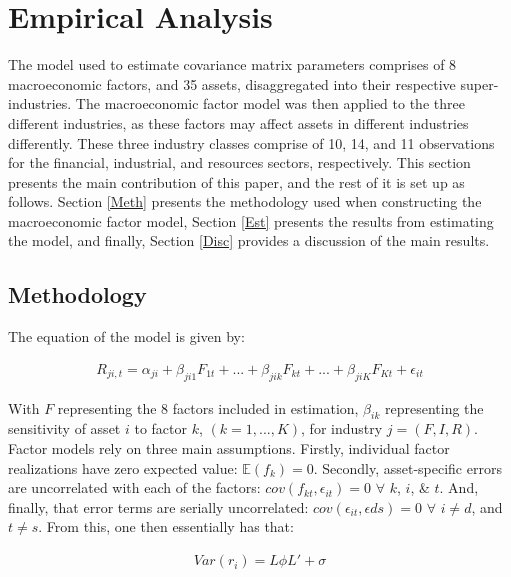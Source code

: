 \documentclass[11pt,preprint, authoryear]{elsarticle}
\numberwithin{equation}{section}
\numberwithin{figure}{section}
\numberwithin{table}{section}
\begin{document}
\hypertarget{empirical-analysis}{%
\section{Empirical Analysis}\label{empirical-analysis}}

The model used to estimate covariance matrix parameters comprises of 8
macroeconomic factors, and 35 assets, disaggregated into their
respective super-industries. The macroeconomic factor model was then
applied to the three different industries, as these factors may affect
assets in different industries differently. These three industry classes
comprise of 10, 14, and 11 observations for the financial, industrial,
and resources sectors, respectively. This section presents the main
contribution of this paper, and the rest of it is set up as follows.
Section \ref{Meth} presents the methodology used when constructing the
macroeconomic factor model, Section \ref{Est} presents the results from
estimating the model, and finally, Section \ref{Disc} provides a
discussion of the main results.

\hypertarget{methodology}{%
\subsection{\texorpdfstring{Methodology
\label{Meth}}{Methodology }}\label{methodology}}

The equation of the model is given by:

\begin{align}
R_{ji,t}=\alpha_{ji} + \beta_{ji1}F_{1t} + ... + \beta_{jik}F_{kt} +...+\beta_{jiK}F_{Kt} +\epsilon_{it}
\end{align}

With \textbf{\(F\)} representing the 8 factors included in estimation,
\(\beta_{ik}\) representing the sensitivity of asset \(i\) to factor
\(k\), \((k=1,...,K)\), for industry \(j=(F,I,R)\). Factor models rely
on three main assumptions. Firstly, individual factor realizations have
zero expected value: \(\mathbb{E}(f_k)=0\). Secondly, asset-specific
errors are uncorrelated with each of the factors:
\(cov(f_{kt}, \epsilon_{it})=0\) \(\forall\) \(k\), \(i\), \& \(t\).
And, finally, that error terms are serially uncorrelated:
\(cov(\epsilon_{it}, \epsilon{ds})=0\) \(\forall\) \(i\neq d\), and
\(t \neq s\). From this, one then essentially has that:

\begin{align}
Var(r_{i}) = L\phi L' + \sigma
\end{align}
\end{document}
